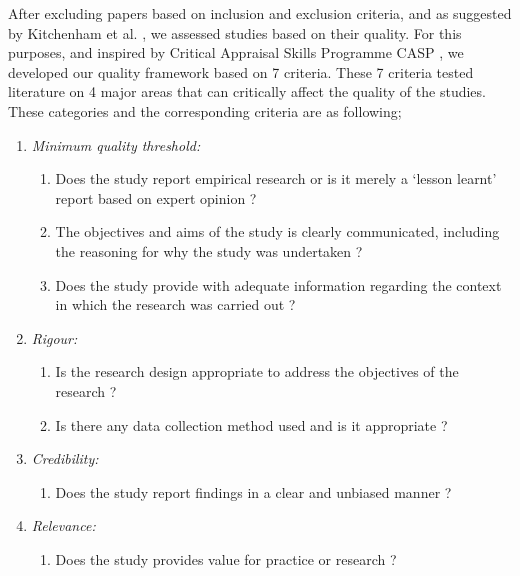\documentclass[review]{elsarticle}
\begin{document}
After excluding papers based on inclusion and exclusion criteria, and as suggested by Kitchenham et al. \cite{kitchenham2015evidence}, we assessed studies based on their quality. For this purposes, and inspired by Critical Appraisal Skills Programme CASP \cite{CASP}, we developed our quality framework based on 7 criteria. These 7 criteria tested literature on 4 major areas that can critically affect the quality of the studies. These categories and the corresponding criteria are as following;

\begin{enumerate}
    \item \emph{Minimum quality threshold:} 
    \begin{enumerate}
        \item Does the study report empirical research or is it merely a `lesson learnt' report based on expert opinion ?
        \item The objectives and aims of the study is clearly communicated, including the reasoning for why the study was undertaken ? 
        \item Does the study provide with adequate information regarding the context in which the research was carried out ?
    \end{enumerate}
    \item \emph{Rigour:}
    \begin{enumerate}
        \item Is the research design appropriate to address the objectives of the research ?
        \item Is there any data collection method used and is it appropriate ?
    \end{enumerate}
    \item \emph{Credibility:}
      \begin{enumerate}
        \item Does the study report findings in a clear and unbiased manner ? 
     \end{enumerate}
    \item \emph{Relevance:}
    \begin{enumerate}
        \item Does the study provides value for practice or research ?
     \end{enumerate}
\end{enumerate}
\end{document}
